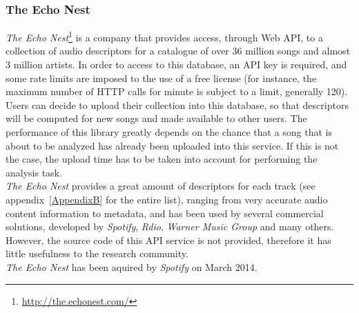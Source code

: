 \subsubsection*{The Echo Nest}
\textit{The Echo Nest}\footnote{\url{http://the.echonest.com/}} is a company that provides access, through Web API, to a collection of audio descriptors for a catalogue of over 36 million songs and almost 3 million artists. In order to access to this database, an API key is required, and some rate limits are imposed to the use of a free license (for instance, the maximum number of HTTP calls for minute is subject to a limit, generally 120). Users can decide to upload their collection into this database, so that descriptors will be computed for new songs and made available to other users. The performance of this library greatly depends on the chance that a song that is about to be analyzed has already been uploaded into this service. If this is not the case, the upload time has to be taken into account for performing the analysis task. \\ 
\textit{The Echo Nest} provides a great amount of descriptors for each track (see appendix~\ref{AppendixB} for the entire list), ranging from very accurate audio content information to metadata, and has been used by several commercial solutions, developed by \textit{Spotify}, \textit{Rdio}, \textit{Warner Music Group} and many others.\\
However, the source code of this API service is not provided, therefore it has little usefulness to the research community. \\ \textit{The Echo Nest} has been aquired by \textit{Spotify} on March 2014.


